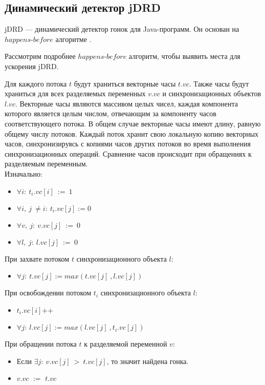 \subsection{Динамический детектор jDRD}
jDRD --- динамический детектор гонок для Java-программ. Он основан на $happens$-$before$ алгоритме \cite{DRD}. 

Рассмотрим подробнее $happens$-$before$ алгоритм, чтобы выявить места для ускорения jDRD.

Для каждого потока $t$ будут храниться векторные часы $t.vc$. Также часы будут храниться для всех разделяемых переменных $v.vc$ и синхронизационных объектов $l.vc$.
Векторные часы являются массивом целых чисел, каждая компонента которого является целым числом, отвечающим за компоненту часов соответствующего потока. В общем случае векторные часы имеют длину, равную общему числу потоков. Каждый поток хранит свою локальную копию векторных часов, синхронизируясь с копиями часов других потоков во время выполнения синхронизационных операций.
Сравнение часов происходит при обращениях к разделяемым переменным.
\\Изначально:  

\begin{itemize}
	\item $ \forall i:\ t_i.vc[i]\ :=\ 1$
	\item $ \forall i,\ j\ \neq i:\ t_i.vc[j] := 0$
	\item $ \forall v,\ j:\  v.vc[j]\ :=\ 0$
	\item $ \forall l,\ j:\  l.vc[j]\ :=\ 0$
\end{itemize}
При захвате потоком $t$ синхронизационного объекта $l$: 

\begin{itemize}
	\item $ \forall j:\ t.vc[j] := max(t.vc[j]\ , l.vc[j])$
\end{itemize}
При освобождении потоком $t_i$ синхронизационного объекта $l$: 

\begin{itemize}
	\item $t_i.vc[i]$++
	\item $ \forall j:\ l.vc[j] := max(l.vc[j]\ , t_i.vc[j])$
\end{itemize}
При обращении потока $t$ к разделяемой переменной $v$: 
\begin{itemize}
	\item Если $ \exists j:\ v.vc[j]\ >\ t.vc[j]$, то значит найдена гонка. 
	\item $v.vc$ $:=$ $t.vc$
\end{itemize}


